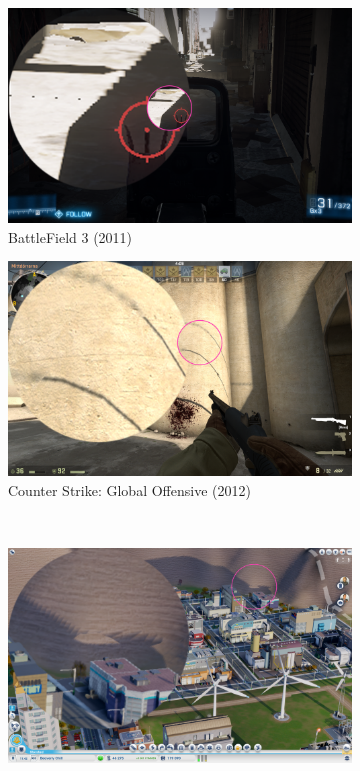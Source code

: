 \begin{figure}[H]
\begin{subfigure}{.5\textwidth}
  \centering
  \includegraphics[width=0.9\linewidth]{images/SMExBF3.png}
  \caption{BattleField 3 (2011)}
  \label{fig:SMExBF3}
\end{subfigure}%
\begin{subfigure}{.5\textwidth}
  \centering
  \includegraphics[width=0.9\linewidth]{images/SMExCSGO.png}
  \caption{Counter Strike: Global Offensive (2012)}
  \label{fig:SMExCSGO}
\end{subfigure}
\\
\begin{subfigure}{.5\textwidth}
  \centering
  \includegraphics[width=0.9\linewidth]{images/SMExSimCity.png}

\end{subfigure}
\end{figure}

